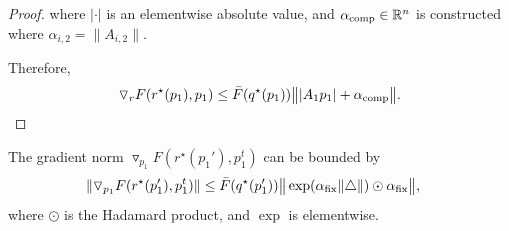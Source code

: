 \begin{proof}
where $| \cdot |$ is an elementwise absolute value, and $\alpha_{\text{comp}} \in \mathbb{R}^n$ is constructed where $\alpha_{i, 2} = \|A_{i, 2}\|$. 

Therefore,
\begin{align*}
    \triangledown_r F(r^\star(p_1), p_1) \le \bar{F}(q^\star(p_1))  \big\| | A_1 p_1 | + \alpha_{\text{comp}} \big\|.
\end{align*}




\end{proof}


\begin{lemma}\label{lemma:grad_p_1}
    The gradient norm $\triangledown_{p_1} F(r^\star(p_1'), p_1^t)$ can be bounded by 
    \begin{align*}
        &\|\triangledown_{p_1} F(r^\star(p_1'), p_1^t)\| \le  \bar{F}(q^\star(p_1'))  \big\|  \exp( \alpha_{\text{fix}} \|\triangle \|) \odot \alpha_{\text{fix}}   \big\|,
    \end{align*}
    where $\odot$ is the Hadamard product, and $\exp$ is elementwise.
\end{lemma}


